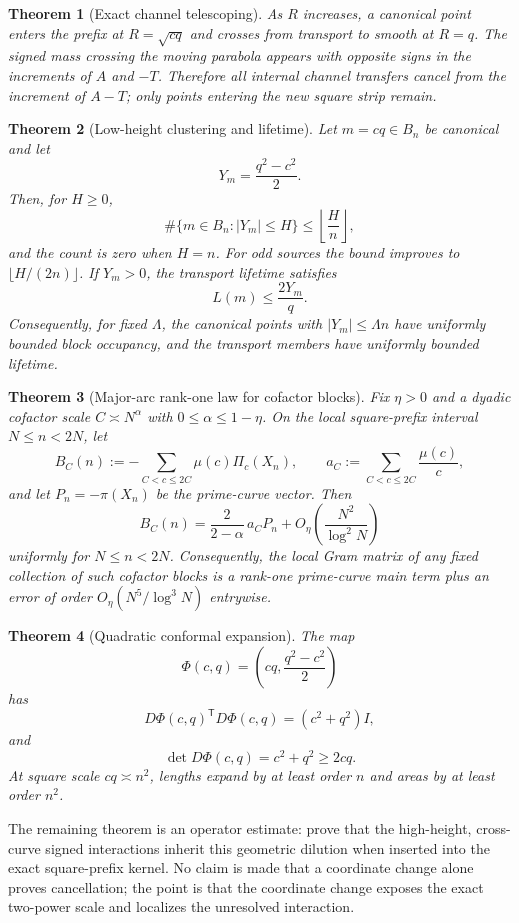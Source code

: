 \documentclass[11pt]{article}
\newtheorem{theorem}{Theorem}[section]
\theoremstyle{definition}
\theoremstyle{remark}
\newcommand{\1}{\mathbf{1}}
\begin{document}
\begin{theorem}[Exact channel telescoping]
\label{thm:intro-telescoping}
As $R$ increases, a canonical point enters the prefix at $R=\sqrt{cq}$ and crosses from transport to smooth at $R=q$.  The signed mass crossing the moving parabola appears with opposite signs in the increments of $A$ and $-T$.  Therefore all internal channel transfers cancel from the increment of $A-T$; only points entering the new square strip remain.
\end{theorem}

\begin{theorem}[Low-height clustering and lifetime]
\label{thm:intro-low}
Let $m=cq\in B_n$ be canonical and let
\[
 Y_m=\frac{q^2-c^2}{2}.
\]
Then, for $H\ge0$,
\[
 \#\{m\in B_n:|Y_m|\le H\}
 \le\left\lfloor\frac{H}{n}\right\rfloor,
\]
and the count is zero when $H=n$.  For odd sources the bound improves to
$\lfloor H/(2n)\rfloor$.
If $Y_m>0$, the transport lifetime satisfies
\[
 L(m)\le\frac{2Y_m}{q}.
\]
Consequently, for fixed $\Lambda$, the canonical points with $|Y_m|\le\Lambda n$ have uniformly bounded block occupancy, and the transport members have uniformly bounded lifetime.
\end{theorem}

\begin{theorem}[Major-arc rank-one law for cofactor blocks]
\label{thm:intro-major-rank-one}
Fix $\eta>0$ and a dyadic cofactor scale $C\asymp N^\alpha$ with
$0\le\alpha\le1-\eta$.  On the local square-prefix interval
$N\le n<2N$, let
\[
 B_C(n):=-\sum_{C<c\le2C}\mu(c)\Pi_c(X_n),
 \qquad
 a_C:=\sum_{C<c\le2C}\frac{\mu(c)}{c},
\]
and let $P_n=-\pi(X_n)$ be the prime-curve vector.  Then
\[
 \boxed{
 B_C(n)=\frac{2}{2-\alpha}\,a_C P_n
 +O_\eta\!\left(\frac{N^2}{\log^2N}\right)
 }
\]
uniformly for $N\le n<2N$.  Consequently, the local Gram matrix of any
fixed collection of such cofactor blocks is a rank-one prime-curve main
term plus an error of order $O_\eta(N^5/\log^3N)$ entrywise.
\end{theorem}

\begin{theorem}[Quadratic conformal expansion]
\label{thm:intro-jacobian}
The map
\[
 \Phi(c,q)=\left(cq,\frac{q^2-c^2}{2}\right)
\]
has
\[
 D\Phi(c,q)^{\mathsf T}D\Phi(c,q)
 =(c^2+q^2)I,
\]
and
\[
 \det D\Phi(c,q)=c^2+q^2\ge2cq.
\]
At square scale $cq\asymp n^2$, lengths expand by at least order $n$ and areas by at least order $n^2$.
\end{theorem}

The remaining theorem is an operator estimate: prove that the high-height, cross-curve signed interactions inherit this geometric dilution when inserted into the exact square-prefix kernel.  No claim is made that a coordinate change alone proves cancellation; the point is that the coordinate change exposes the exact two-power scale and localizes the unresolved interaction.
\end{document}
